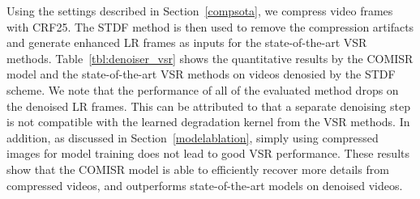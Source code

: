 Using the settings described in Section~\ref{compsota}, we compress video frames with CRF25.
The STDF method is then used to remove the compression artifacts and generate enhanced LR frames as inputs for the state-of-the-art VSR methods.  
Table~\ref{tbl:denoiser_vsr} shows
the quantitative results by the COMISR model and the state-of-the-art VSR methods on videos denosied by the STDF scheme.
We note that the performance of all of the evaluated method drops on the denoised LR frames.
This can be attributed to that a separate denoising step is not compatible with the learned degradation kernel from the VSR methods.
In addition, as discussed in Section~\ref{modelablation}, simply using compressed images for model training does not lead to good VSR performance. 
These results show that the COMISR model is able to efficiently recover more details from compressed videos, and outperforms state-of-the-art models on denoised videos.




\begin{table}[tp]
\vspace{1mm}

\caption{Ablation study on applying a video denoiser to the compressed frames before the VSR models using the Vid4 dataset.
Each entry shows the PSNR/SSIM results on the Y or RGB channel.
The COMISR model outperforms the state-of-the-art VSR methods with the STDF~\cite{stdf} denoiser.
}
\vspace{-2mm}
\label{tbl:denoiser_vsr}
\end{table}



